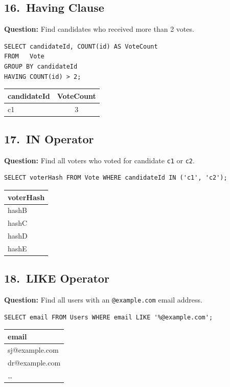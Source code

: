 \documentclass[12pt, a4paper]{article}
\begin{document}
\subsection{16.\ Having Clause}
\textbf{Question:} Find candidates who received more than 2 votes.
\begin{lstlisting}
SELECT candidateId, COUNT(id) AS VoteCount
FROM   Vote
GROUP BY candidateId
HAVING COUNT(id) > 2;
\end{lstlisting}
\begin{center}
\begin{tabular}{|>{\ttfamily}l|c|}
\hline
\textbf{candidateId} & \textbf{VoteCount} \\ \hline
c1 & 3 \\ \hline
\end{tabular}
\end{center}

\subsection{17.\ IN Operator}
\textbf{Question:} Find all voters who voted for candidate \texttt{c1} or \texttt{c2}.
\begin{lstlisting}
SELECT voterHash FROM Vote WHERE candidateId IN ('c1', 'c2');
\end{lstlisting}
\begin{center}
\begin{tabular}{|>{\ttfamily}l|}
\hline
\textbf{voterHash} \\ \hline
hashB \\ hashC \\ hashD \\ hashE \\ \hline
\end{tabular}
\end{center}

\subsection{18.\ LIKE Operator}
\textbf{Question:} Find all users with an \texttt{@example.com} email address.
\begin{lstlisting}
SELECT email FROM Users WHERE email LIKE '%@example.com';
\end{lstlisting}
\begin{center}
\begin{tabular}{|l|}
\hline
\textbf{email} \\ \hline
sj@example.com \\
dr@example.com \\
\ldots \\ \hline
\end{tabular}
\end{center}
\end{document}
